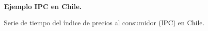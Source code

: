 \begin{figure}[H]
	\centering
	\textbf{Ejemplo IPC en Chile.}\par\medskip
	\caption{Serie de tiempo del índice de precios al consumidor (IPC) en Chile.}\label{fig18}
\end{figure}


\pagebreak
